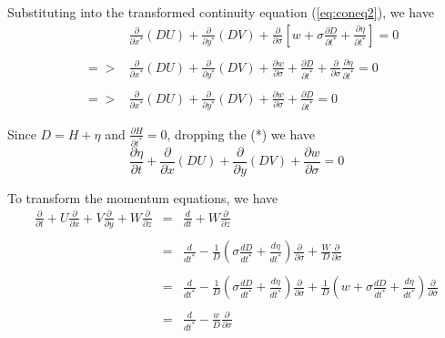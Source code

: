 \documentclass[oribibl]{llncs}
\begin{document}
Substituting into the transformed continuity equation (\ref{eq:coneq2}), we have
\begin{eqnarray}\label{eq:coneq3}
&&\frac{\partial}{\partial x^*}(DU) +\frac{\partial}{\partial y^*}(DV) + \frac{\partial}{\partial \sigma} \left[w+ \sigma \frac{\partial D}{\partial t^*} + \frac{\partial \eta}{\partial t^*} \right] = 0 \nonumber \\ \nonumber \\  
&=>& \frac{\partial}{\partial x^*}(DU) +\frac{\partial}{\partial y^*}(DV) + \frac{\partial w}{\partial \sigma} +\frac{\partial D}{\partial t^*} + \frac{\partial}{\partial \sigma} \frac{\partial \eta}{\partial t^*} = 0  \nonumber \\ \nonumber \\ 
&=>& \frac{\partial}{\partial x^*}(DU) +\frac{\partial}{\partial y^*}(DV) + \frac{\partial w}{\partial \sigma} +\frac{\partial D}{\partial t^*} = 0
\end{eqnarray}

Since $D=H+\eta$ and $\frac{\partial H}{\partial t^*}=0$,  dropping the (*)  we have
\begin{equation}\label{eq:coneq4}
\frac{\partial \eta}{\partial t}+\frac{\partial}{\partial x}(DU) +\frac{\partial}{\partial y}(DV) + \frac{\partial w}{\partial \sigma}= 0 
\end{equation}

To transform the momentum equations, we have
\begin{eqnarray}
\frac{\partial}{\partial t}+U\frac{\partial}{\partial x} + V\frac{\partial}{\partial y}+W\frac{\partial}{\partial z} &=& \frac{d}{dt}+W\frac{\partial}{\partial z} \nonumber \\ \nonumber \\ 
&=&\frac{d}{dt^*} -\frac{1}{D}\left( \sigma \frac{dD}{dt^*} +\frac{d\eta}{dt^*}   \right) \frac{\partial}{\partial \sigma} + \frac{W}{D}\frac{\partial}{\partial \sigma}  \nonumber \\ \nonumber \\ 
&=&\frac{d}{dt^*} -\frac{1}{D}\left( \sigma \frac{dD}{dt^*} +\frac{d\eta}{dt^*}   \right) \frac{\partial}{\partial \sigma}  +\frac{1}{D}\left( w+ \sigma \frac{dD}{dt^*} +\frac{d\eta}{dt^*} \right) \frac{\partial}{\partial \sigma}  \nonumber \\ \nonumber \\ 
&=&\frac{d}{dt^*} - \frac{w}{D} \frac{\partial}{\partial \sigma}
\end{eqnarray}
\end{document}
